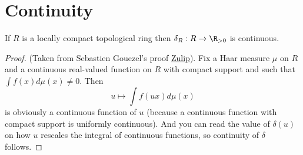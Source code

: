 \section{Continuity}

\begin{theorem}
  \label{DistribHaarChar.continuous}
  If $R$ is a locally compact topological ring then
  $\delta_R:R\to\R_{>0}$ is continuous.
\end{theorem}
\begin{proof} (Taken from Sebastien Gouezel's proof \href{https://leanprover.zulipchat.com/#narrow/channel/217875-Is-there-code-for-X.3F/topic/.22Haar.20measure.20is.20continuous.22/near/487299979}{Zulip}).
  Fix a Haar measure $\mu$ on $R$ and a continuous real-valued function
  on $R$ with compact support and such that $\int f(x) d\mu(x)\not=0$.
  Then $$u \mapsto \int f(ux) d\mu(x)$$ is obviously a continuous function
  of $u$ (because a continuous function with compact support is uniformly
   continuous). And you can read the value of $\delta(u)$ on how $u$
   rescales the integral of continuous functions, so continuity of $\delta$
   follows.
\end{proof}


